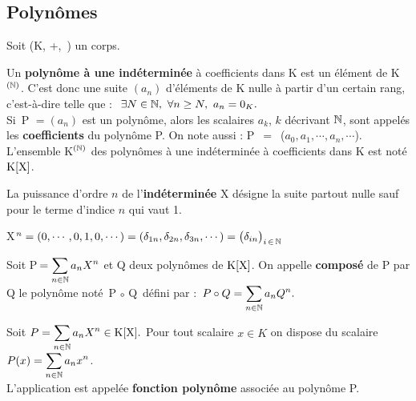 \vspace{1cm}

\subsection{Polynômes}

\vspace{0.5cm}

\begin{center}
    Soit (K, +,\ \x) un corps.
\end{center}

\vspace{0.5cm}

\noindent Un \textbf{polynôme à une indéterminée} à coefficients dans K est un élément de K\(^{(\mathbb{N})}\). C'est donc une suite \((a_n)\) d'éléments de K nulle à partir d'un certain rang,\\
c'est-à-dire telle que : \(\ \exists N\in \NN,\ \forall n\geq N,\ a_n = 0_K. \)\vspace{0.1cm}\\
Si\, P\,\(\,=(a_n)\) est un polynôme, alors les scalaires \(a_k\), \(k\) décrivant \(\mathbb{N}\), sont appelés les \textbf{coefficients} du polynôme P. On note aussi : P $\,=\,$ (\(a_0,a_1,\cdots,a_n,\cdots\)).\\
L'ensemble K\(^{(\mathbb{N})}\) des polynômes à une indéterminée à coefficients dans K est noté $\text{K}[\text{X}]$. 

\vspace{1.3cm}

La puissance d'ordre $n$ de l'\textbf{indéterminée} X désigne la suite partout nulle sauf pour le terme d'indice $n$ qui vaut 1.\vspace{0.1cm}

\hspace{1.5cm}X\(^n=(0,\cdots,0,1,0,\cdots)=(\delta_{1n},\delta_{2n},\delta_{3n},\cdots)=\bigl(\delta_{in}\bigr)_{i\,\in\, \mathbb{N}}\)

\vspace{1.3cm}

\noindent Soit P\(\:=\displaystyle \sum _{n\in \mathbb{N}}a_nX^n\) et Q deux polynômes de $\text{K}[\text{X}]$. On appelle \textbf{composé} de P par Q le polynôme noté\, P\(\,\circ\,\)Q\, défini par : \(\,\displaystyle P\circ Q=\sum_{n\in \mathbb{N}}a_nQ^n.\)

\newpage

\noindent Soit \(\displaystyle P=\sum_{n\in \mathbb{N}}a_nX^n\in \text{K}[\text{X}]. \) Pour tout scalaire \(x\in K\) on dispose du scalaire \(\displaystyle P(x)=\sum_{n\in \mathbb{N}}a_nx^n\).\vspace{0.2cm}\\
L'application \hspace{3.3cm} est appelée \textbf{fonction polynôme} associée au polynôme P.

